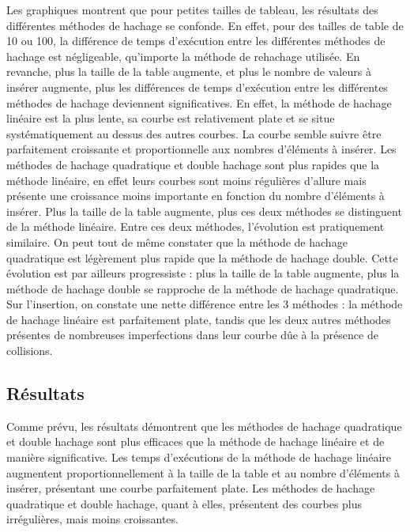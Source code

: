 \documentclass{article}
\begin{document}
    \newpage
    Les graphiques montrent que pour petites tailles de tableau, les résultats des différentes méthodes de hachage se confonde.
    En effet, pour des tailles de table de 10 ou 100, la différence de temps d'exécution entre les différentes méthodes de hachage est négligeable, qu'importe la méthode de rehachage utilisée.
    En revanche, plus la taille de la table augmente, et plus le nombre de valeurs à insérer augmente, plus les différences de temps d'exécution entre les différentes méthodes de hachage deviennent significatives.
    En effet, la méthode de hachage linéaire est la plus lente, sa courbe est relativement plate et se situe systématiquement au dessus des autres courbes.
    La courbe semble suivre être parfaitement croissante et proportionnelle aux nombres d'éléments à insérer.
    Les méthodes de hachage quadratique et double hachage sont plus rapides que la méthode linéaire, en effet leurs courbes sont moins régulières d'allure mais présente une croissance moins importante en fonction du nombre d'éléments à insérer.
    Plus la taille de la table augmente, plus ces deux méthodes se distinguent de la méthode linéaire.
    Entre ces deux méthodes, l'évolution est pratiquement similaire.
    On peut tout de même constater que la méthode de hachage quadratique est légèrement plus rapide que la méthode de hachage double.
    Cette évolution est par ailleurs progressiste : plus la taille de la table augmente, plus la méthode de hachage double se rapproche de la méthode de hachage quadratique.
    Sur l'insertion, on constate une nette différence entre les 3 méthodes : la méthode de hachage linéaire est parfaitement plate, tandis que les deux autres méthodes présentes de nombreuses imperfections dans leur courbe dûe à la présence de collisions.

    \subsection{Résultats}\label{subsec:resultats}

    Comme prévu, les résultats démontrent que les méthodes de hachage quadratique et double hachage sont plus efficaces que la méthode de hachage linéaire et de manière significative.
    Les temps d'exécutions de la méthode de hachage linéaire augmentent proportionnellement à la taille de la table et au nombre d'éléments à insérer, présentant une courbe parfaitement plate.
    Les méthodes de hachage quadratique et double hachage, quant à elles, présentent des courbes plus irrégulières, mais moins croissantes.
\end{document}
